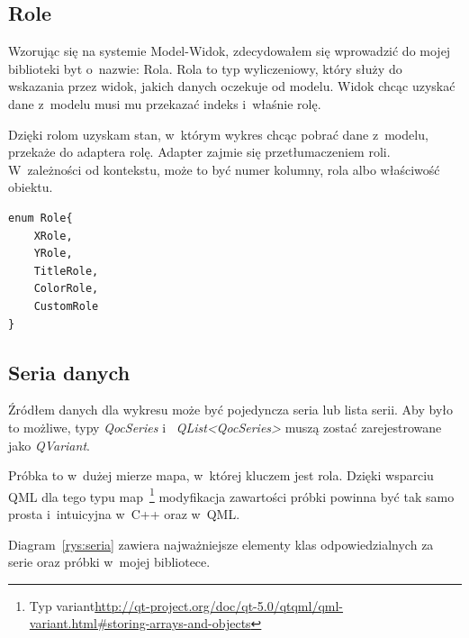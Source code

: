 \subsection{Role}
Wzorując się na systemie Model-Widok, zdecydowałem się wprowadzić do mojej biblioteki byt o~nazwie: Rola. Rola to typ wyliczeniowy, który służy do wskazania przez widok, jakich danych oczekuje od modelu. Widok chcąc uzyskać dane z~modelu musi mu przekazać indeks i~właśnie rolę.

Dzięki rolom uzyskam stan, w~którym wykres chcąc pobrać dane z~modelu, przekaże do adaptera rolę. Adapter zajmie się przetłumaczeniem roli. W~zależności od kontekstu, może to być numer kolumny, rola  albo właściwość obiektu.

\begin{lstlisting}[caption=Rola -- typ wyliczeniowy, label=code:role]
enum Role{
	XRole,
	YRole,
	TitleRole,
	ColorRole,
	CustomRole
}
\end{lstlisting}



\subsection{Seria danych}
Źródłem danych dla wykresu może być pojedyncza seria lub lista serii. Aby było to możliwe, typy \textit{QocSeries} i~ \textit{QList<QocSeries>} muszą zostać zarejestrowane jako  \textit{QVariant}.

Próbka to w~dużej mierze mapa, w~której kluczem jest rola. Dzięki wsparciu QML dla tego typu map~\footnote{Typ variant\url{http://qt-project.org/doc/qt-5.0/qtqml/qml-variant.html\#storing-arrays-and-objects}} modyfikacja zawartości próbki powinna być tak samo prosta i~intuicyjna w~C++ oraz w~QML. 

Diagram~\ref{rys:seria} zawiera najważniejsze elementy klas odpowiedzialnych za serie oraz próbki w~mojej bibliotece.

